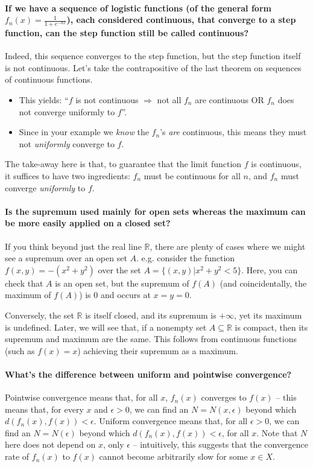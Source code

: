 \documentclass[10pt,english]{article}
\begin{document}
\paragraph{If we have a sequence of logistic functions (of the general form $f_n(x) = \frac{1}{1+e^{-nx}}$), each considered continuous, that converge to a step function, can the step function still be called continuous?}
Indeed, this sequence converges to the step function, but the step function itself is not continuous.
Let's take the contrapositive of the last theorem on sequences of continuous functions.
\begin{itemize}
\item This yields:
``$f$ is not continuous $\Rightarrow$ not all $f_n$ are continuous OR $f_n$ does not converge uniformly to $f$''.
\item Since in your example we \textit{know} the $f_n$'s \textit{are} continuous, this means they must not \textit{uniformly} converge to $f$.
\end{itemize}
The take-away here is that, to guarantee that the limit function $f$ is continuous, it suffices to have two ingredients: $f_n$ must be continuous for all $n$, and $f_n$ must converge \textit{uniformly} to $f$.


\paragraph{Is the supremum used mainly for open sets whereas the maximum can be more easily applied on a closed set?}
If you think beyond just the real line $\mathbb{R}$, there are plenty of cases where we might see a supremum over an open set $A$.
e.g. consider the function $f(x,y) = -(x^2 + y^2)$ over the set $A = \{(x,y) | x^2 + y^2 < 5\}$. Here, you can check that $A$ is an open set, but the supremum of $f(A)$ (and coincidentally, the maximum of $f(A)$) is $0$ and occurs at $x=y=0$.

Conversely, the set $\mathbb{R}$ is itself closed, and its supremum is $+\infty$, yet its maximum is undefined.
Later, we will see that, if a nonempty set $A\subseteq\mathbb{R}$ is compact, then its supremum and maximum are the same.
This follows from continuous functions (such as $f(x)=x$) achieving their supremum as a maximum.


\paragraph{What's the difference between uniform and pointwise convergence?}
Pointwise convergence means that, for all $x$, $f_n(x)$ converges to $f(x)$ -- this means that, for every $x$ and $\epsilon>0$, we can find an $N = N(x,\epsilon)$ beyond which $d(f_n(x),f(x))<\epsilon$.
Uniform convergence means that, for all $\epsilon>0$, we can find an $N = N(\epsilon)$ beyond which $d(f_n(x),f(x))<\epsilon$, for all $x$. Note that $N$ here does not depend on $x$, only $\epsilon$ -- intuitively, this suggests that the convergence rate of $f_n(x)$ to $f(x)$ cannot become arbitrarily slow for some $x\in X$.
\end{document}
